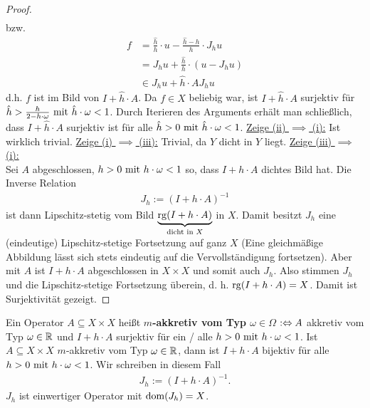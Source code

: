 \begin{proof}
\begin{align*}
	\end{align*}
	bzw. 
	\begin{align*}
		f&=\frac{\hat{h}}{h}\cdot u-\frac{\hat{h}-h}{h}\cdot J_h u\\
		&=J_h u+\frac{\hat{h}}{h}\cdot\left(u-J_h u\right)\\
		&\in J_h u+\hat{h}\cdot A J_h u
	\end{align*}
	d.h. $f$ ist im Bild von $I+\hat{h}\cdot A$. 
	Da $f\in X$ beliebig war, ist $I+\hat{h}\cdot A$ surjektiv für $\hat{h}>\frac{h}{2-h\cdot\omega}\mit \hat{h}\cdot\omega<1$. 
	Durch Iterieren des Arguments erhält man schließlich, dass $I+\hat{h}\cdot A$ surjektiv ist für alle $\hat{h}>0\mit\hat{h}\cdot\omega<1$.\nl
	\underline{Zeige (ii) $\implies$ (i):} Ist wirklich trivial.\nl
	\underline{Zeige (i) $\implies$ (iii):} Trivial, da $Y$ dicht in $Y$ liegt.\nl
	\underline{Zeige (iii) $\implies$ (i):}\\
	Sei $A$ abgeschlossen, $h>0\mit h\cdot\omega<1$ so, dass $I+h\cdot A$ dichtes Bild hat. 
	Die Inverse Relation
	\begin{align*}
		J_h:=(I+h\cdot A)^{-1}
	\end{align*}
	ist dann Lipschitz-stetig vom Bild $\underbrace{\rg(I+h\cdot A)}_{\text{dicht in }X}$ in $X$. 
	Damit besitzt $J_h$ eine (eindeutige) Lipschitz-stetige Fortsetzung auf ganz $X$ 
	(Eine gleichmäßige Abbildung lässt sich stets eindeutig auf die Vervollständigung fortsetzen). 
	Aber mit $A$ ist $I+h\cdot A$ abgeschlossen in $X\times X$ und somit auch $J_h$. 
	Also stimmen $J_h$ und die Lipschitz-stetige Fortsetzung überein, d. h. $\rg(I+h\cdot A)=X$. 
	Damit ist Surjektivität gezeigt.
\end{proof}

\begin{definition}
	Ein Operator $A\subseteq X\times X$ heißt \textbf{$m$-akkretiv vom Typ $\omega\in\Omega$} $:\gdw\\ A$ akkretiv vom Typ $\omega\in\R$ und $I+h\cdot A$ surjektiv für ein / alle $h>0\mit h\cdot\omega<1$.\nl
	Ist $A\subseteq X\times X$  $m$-akkretiv vom Typ $\omega\in\R$, dann ist $I+h\cdot A$ bijektiv für alle $h>0\mit h\cdot\omega<1$. 
	Wir schreiben in diesem Fall
	\begin{align*}
		J_h:=(I+h\cdot A)^{-1}.
	\end{align*}
	$J_h$ ist einwertiger Operator mit $\dom(J_h)=X$.
\end{definition}


